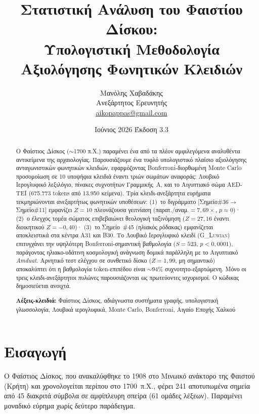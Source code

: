 \documentclass[12pt,a4paper]{article}
\title{\selectlanguage{greek}Στατιστική Ανάλυση του Φαιστίου Δίσκου:\\
Υπολογιστική Μεθοδολογία Αξιολόγησης Φωνητικών Κλειδιών}
\author{\selectlanguage{greek}Μανόλης Χαβαδάκης\\
\small \selectlanguage{greek}Ανεξάρτητος Ερευνητής\\
\small \href{mailto:aikopappas@gmail.com}{aikopappas@gmail.com}}
\date{\selectlanguage{greek}Ιούνιος 2026 \quad Έκδοση 3.3}
\begin{document}
\maketitle

\begin{abstract}
Ο Φαίστιος Δίσκος ($\sim$1700 π.Χ.) παραμένει ένα από τα πλέον αμφιλεγόμενα αναλυθέντα αντικείμενα της αρχαιολογίας. Παρουσιάζουμε ένα τυφλό υπολογιστικό πλαίσιο αξιολόγησης ανταγωνιστικών φωνητικών κλειδιών, εφαρμόζοντας Bonferroni-διορθωμένη Monte Carlo προσομοίωση σε 10 υποψήφια κλειδιά έναντι τριών σωμάτων αναφοράς: Λουβικό Ιερογλυφικό λεξιλόγιο, πίνακες συχνοτήτων Γραμμικής~Α, και το Αιγυπτιακό σώμα AED-TEI (675.773 tokens από 13.950 κείμενα). Τρία κλειδι-ανεξάρτητα ευρήματα τεκμηριώνονται ανεξαρτήτως φωνητικών υποθέσεων: (1)~το διγράμματο [Σημείο\#36$\to$Σημείο\#11] εμφανίζει $Z=10$ πλεονάζουσα γειτνίαση (παρατ./αναμ.$=7{,}69\times$, $p\approx 0$)· (2)~ο έλεγχος τομέα σώματος επιβεβαιώνει θεολογική ταξινόμηση ($Z=27{,}16$ έναντι διοικητικού $Z=-0{,}40$)· (3)~το Σημείο~\#45 (ηλιακός ρόδακας) εμφανίζεται αποκλειστικά στα κέντρα A31 και B30. Το Λουβικό Ιερογλυφικό κλειδί (\textsc{G\_Luwian}) επιτυγχάνει την υψηλότερη Bonferroni-σημαντική βαθμολογία ($S=523$, $p<0{,}0001$), παράγοντας ηλιακο-υδάτινη κοσμολογική ανάγνωση δομικά παράλληλη με το Αιγυπτιακό \textit{Amduat}. Αρνητικό τεστ ελέγχου σε συνθετικό δίσκο ($Z=1{,}99$, μη σημαντικό) αποκαλύπτει ότι η βαθμολογία token-επιπέδου είναι $\sim$94\% συχνοτητο-εξαρτώμενη. Μόνο οι τρεις κλειδι-ανεξάρτητοι πυλώνες παρουσιάζονται ως πρωτεύοντες ισχυρισμοί. Ο κώδικας δημοσιεύεται ανοιχτά.

\medskip
\noindent\textbf{Λέξεις-κλειδιά:} Φαίστιος Δίσκος, αδιάγνωστα συστήματα γραφής, υπολογιστική γλωσσολογία, Λουβικά ιερογλυφικά, Monte Carlo, Bonferroni, Αιγαίο Εποχής Χαλκού
\end{abstract}

\tableofcontents
\newpage

\section{Εισαγωγή}

Ο Φαίστιος Δίσκος, που ανακαλύφθηκε το 1908 στο Μινωικό ανάκτορο της Φαιστού (Κρήτη) και χρονολογείται περίπου στο 1700~π.Χ., φέρει 241 αποτυπωμένα σημεία από 45 διακριτά σύμβολα σε αμφίπλευρη σπείρα (61 ομάδες λέξεων). Παραμένει μοναδικό εύρημα χωρίς δεύτερο παράδειγμα.
\end{document}
